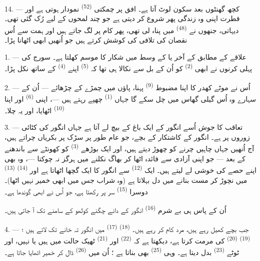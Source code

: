 14. --- کچھ گھنٹوں بعد سکون لوٹ آتا ہے۔ افق پر چمکتی 
\textsuperscript{(52)} نمودار ہوتی ہے اور فطرت اپنی وہ زندگی پھر شروع
کر دیتی ہے جو چند لمحوں کے لیے رُک گئی تھی۔ دیہاتی، جنھوں نے
 \textsuperscript{(48)} میں پناہ لی تھی، پھر کام پر لگ
جاتے ہیں اور ہمت سے اُس نقصان کی تلافی کی کوشش کرتے ہیں جو اُنھیں
ابھی اٹھانا پڑا۔

\VUsaut{6.0mm}
\VUsaut{3.6mm}

\VUsaut{1.4mm}
\VUsaut{4.0mm}

1. --- علاقے کے مطابق  کے آخر یا  کے وسط
میں شکار کا موسم کھلتا ہے۔ سورج کی پہلی کرنوں نے ابھی  \textsuperscript{(2)} کو اُن کے بل سے نکالا ہی تھا کہ
 \textsuperscript{(5)} اپنے 
\textsuperscript{(4)} کے ساتھ نکل پڑا۔

2. --- اُس نے موٹے کھدر کا اپنا مضبوط 
\textsuperscript{(9)} پہنا، پاؤں میں چمڑے کے  چڑھائے
— اُن کے سہارے وہ اُس گیلی گھاس میں چل سکے گا جہاں  \textsuperscript{(1)} چھپے رہتے ہیں —، اپنی 
\textsuperscript{(6)} اور اپنا 
\textsuperscript{(10)} اٹھایا، اور یہ چلا۔

3. --- تعاقب کا جوش اُسے انگور کے ایک باغ کے بیچ لے آتا ہے جہاں
انگور کی کٹائی زوروں پر ہے۔ انگور کے کاشتکار کے بچے، جو عام طور پر
سڑک پر بکریاں چراتے ہیں، آج اُنھیں جہاں چاہیں چرنے کو چھوڑ دیتے ہیں،
اور ایک بوڑھے  \textsuperscript{(3)} کو کھونٹے سے باندھنے
کے بعد — جو اپنی آزادی سے فائدہ اٹھا کر بھاگ نکلنے میں ہرگز نہ چوکتا
—، وہ بھی اپنے حصے کی خوشی لے لیتے ہیں۔ ایک  \textsuperscript{(12)} سے انگور کا ایک گچھا اٹھاتا ہے اور
 \textsuperscript{(14)}  \textsuperscript{(13)}
میں نچوڑ کر مست بنانے میں دل بہلاتا ہے (وہ شراب جس میں ابھی خمیر
نہیں اٹھا)۔ دوسرا  \textsuperscript{(15)} سر پر
رکھتا ہے، جو اُس نے ابھی گوندھا ہے۔

اُن کے پاس ہی بے شرم  \textsuperscript{(16)} انگور کے
دانے چگنے کولھو کے سامنے تک آ جاتی ہیں۔

4. --- جب بچے کھیل رہے ہیں، مرد کام کر رہے ہیں۔  \textsuperscript{(18)} 
\textsuperscript{(17)} میں انگور تہ خانے تک لاتے ہیں ؛  \textsuperscript{(19)}  \textsuperscript{(20)} کی
مرمت کرتا ہے، دیکھتا ہے کہ 
\textsuperscript{(22)} اور  \textsuperscript{(21)} ٹھیک
حالت میں ہیں یا نہیں، اور ٹوٹے 
\textsuperscript{(23)} بدل دیتا ہے۔ وہی 
\textsuperscript{(25)} بھی بناتا ہے ؛ اُن میں 
\textsuperscript{(26)} ڈال کر خمیر اٹھایا جاتا ہے۔


